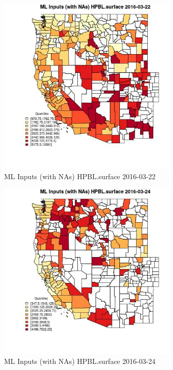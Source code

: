 \clearpage 

\begin{figure} 
\centering  
\includegraphics[width=0.77\textwidth]{Code_Outputs/Report_ML_input_PM25_Step4_part_e_de_duplicated_aveswNAs_CountyHPBLsurfaceMean2016-03-22_2016-03-22.jpg} 
\caption{\label{fig:Report_ML_input_PM25_Step4_part_e_de_duplicated_aveswNAsCountyHPBLsurfaceMean2016-03-22_2016-03-22}ML Inputs (with NAs) HPBL.surface 2016-03-22} 
\end{figure} 
 

\begin{figure} 
\centering  
\includegraphics[width=0.77\textwidth]{Code_Outputs/Report_ML_input_PM25_Step4_part_e_de_duplicated_aveswNAs_CountyHPBLsurfaceMean2016-03-24_2016-03-24.jpg} 
\caption{\label{fig:Report_ML_input_PM25_Step4_part_e_de_duplicated_aveswNAsCountyHPBLsurfaceMean2016-03-24_2016-03-24}ML Inputs (with NAs) HPBL.surface 2016-03-24} 
\end{figure} 
 

